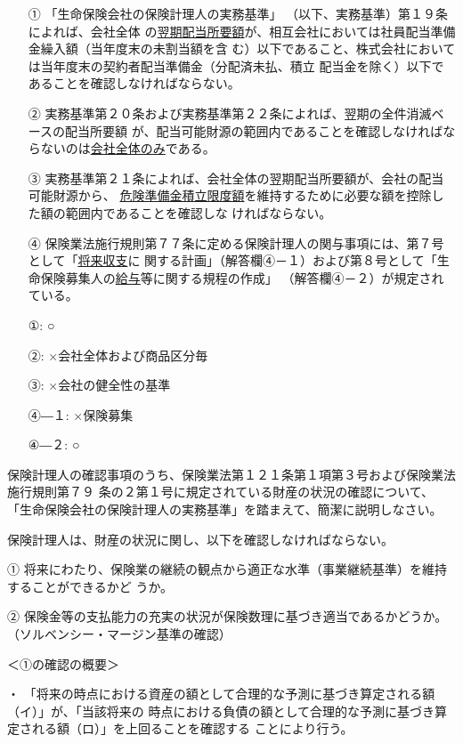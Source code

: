 \documentclass[report,gutter=10mm,fore-edge=10mm,uplatex,dvipdfmx]{jlreq}
\begin{document}
\begin{itemize}
\item[①] 「生命保険会社の保険計理人の実務基準」
（以下、実務基準）第１９条によれば、会社全体
の\underline{翌期配当所要額}が、相互会社においては社員配当準備金繰入額（当年度末の未割当額を含
む）以下であること、株式会社においては当年度末の契約者配当準備金（分配済未払、積立
配当金を除く）以下であることを確認しなければならない。
\item[②] 実務基準第２０条および実務基準第２２条によれば、翌期の全件消滅ベースの配当所要額
が、配当可能財源の範囲内であることを確認しなければならないのは\underline{会社全体のみ}である。
\item[③] 実務基準第２１条によれば、会社全体の翌期配当所要額が、会社の配当可能財源から、
\underline{危険準備金積立限度額}を維持するために必要な額を控除した額の範囲内であることを確認しな
ければならない。
\item[④] 保険業法施行規則第７７条に定める保険計理人の関与事項には、第７号として「\underline{将来収支}に
関する計画」（解答欄④－１）および第８号として「生命保険募集人の\underline{給与}等に関する規程の作成」
（解答欄④－２）が規定されている。
\end{itemize}
 
\answer{}
\begin{itemize}
\item[ ①: ] ○
\item[ ②: ] ×会社全体および商品区分毎
\item[ ③: ] ×会社の健全性の基準
\item[ ④―１: ] ×保険募集
\item[ ④―２: ] ○
\end{itemize}

保険計理人の確認事項のうち、保険業法第１２１条第１項第３号および保険業法施行規則第７９
条の２第１号に規定されている財産の状況の確認について、
「生命保険会社の保険計理人の実務基準」を踏まえて、簡潔に説明しなさい。

\answer{}
保険計理人は、財産の状況に関し、以下を確認しなければならない。

① 将来にわたり、保険業の継続の観点から適正な水準（事業継続基準）を維持することができるかど
うか。

② 保険金等の支払能力の充実の状況が保険数理に基づき適当であるかどうか。
（ソルベンシー・マージン基準の確認）

＜①の確認の概要＞

・ 「将来の時点における資産の額として合理的な予測に基づき算定される額（イ）」が、「当該将来の
時点における負債の額として合理的な予測に基づき算定される額（ロ）」を上回ることを確認する
ことにより行う。
\end{document}
